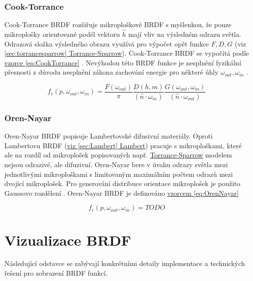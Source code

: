 \documentclass[czech,master,dept460,male,cpp,cpdeclaration]{diploma}
\newcommand{\uvec}[1]{\hat{#1}}
\begin{document}
\subsubsection{Cook-Torrance}
Cook-Torrance BRDF rozšiřuje mikroploškové BRDF s myšlenkou, že pouze mikroplošky orientované podél vektoru \(\uvec{h}\) mají vliv na výsledném odrazu světla. Odrazová složka výsledného obrazu využívá pro výpočet opět funkce \(F, D, G\) (viz \hyperref[sec:torrancesparrow]{\ref{sec:torrancesparrow} Torrance-Sparrow}). Cook-Torrance BRDF se vypočítá podle \hyperref[eq:CookTorrance]{vzorce \ref{eq:CookTorrance}} \cite{CookTorranceBRDF}. Nevýhodou této BRDF funkce je nesplnění fyzikální přesnosti z důvodu nesplnění zákona zachování energie pro některé úhly \(\omega_{out},\omega_{in}\) \cite{BRDFOverview}.

\begin{equation} \label{eq:CookTorrance}
    f_r\left(p,\omega_{out},\omega_{in}\right)  = \frac{F(\omega_{out})}{\pi} \frac{D(h,m)}{(\uvec{n}\cdot\omega_{in})} \frac{G(\omega_{out},\omega_{in})}{(\uvec{n}\cdot\omega_{out})}
\end{equation}

\subsubsection{Oren-Nayar}
Oren-Nayar BRDF popisuje Lambertovské difusivní materiály. Oproti Lambertovu BRDF (\hyperref[sec:Lambert]{viz \ref{sec:Lambert} Lambert}) pracuje s mikroploškami, které ale na rozdíl od mikroplošek popisovaných např. \hyperref[sec:torrancesparrow]{Torrance-Sparrow} modelem nejsou odrazivé, ale difuzivní. Oren-Nayar bere v úvahu odrazy světla mezi jednotlivými mikroploškami s limitovaným maximálním počtem odrazů mezi dvojicí mikroplošek. Pro generování distribuce orientace mikroplošek je použito Gaussovo rozdělení \cite{OrenNayar} \cite{BRDFOverview}. Oren-Nayar BRDF je definováno \hyperref[eq:OrenNayar]{vzorcem \ref{eq:OrenNayar}}

\begin{equation} \label{eq:OrenNayar}
    f_r\left(p,\omega_{out},\omega_{in}\right)  = TODO
\end{equation}

\clearpage
\section{Vizualizace BRDF}
Následující odstavce se zabývají konkrétními detaily implementace a technických řešení pro zobrazení BRDF funkcí.
\end{document}
